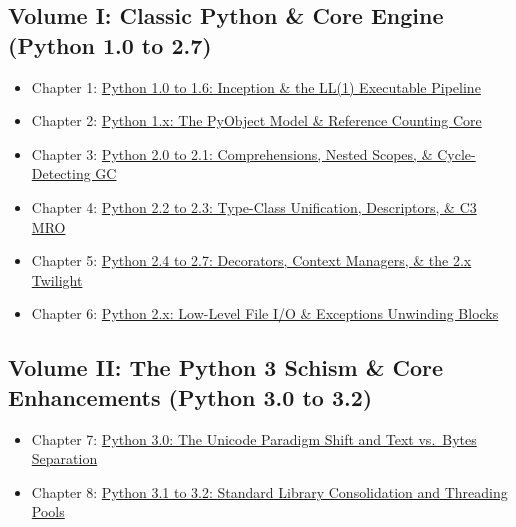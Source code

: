 \hypertarget{volume-i-classic-python-core-engine-python-1.0-to-2.7}{%
\subsection{Volume I: Classic Python \& Core Engine (Python 1.0 to
2.7)}\label{volume-i-classic-python-core-engine-python-1.0-to-2.7}}

\begin{itemize}
\tightlist
\item
  Chapter 1:
  \protect\hyperlink{chapter-1-python-10-to-16-inception--the-ll1-executable-pipeline}{Python
  1.0 to 1.6: Inception \& the LL(1) Executable Pipeline}
\item
  Chapter 2:
  \protect\hyperlink{chapter-2-python-1x-the-pyobject-model--reference-counting-core}{Python
  1.x: The PyObject Model \& Reference Counting Core}
\item
  Chapter 3:
  \protect\hyperlink{chapter-3-python-20-to-21-comprehensions-nested-scopes--cycle-detecting-gc}{Python
  2.0 to 2.1: Comprehensions, Nested Scopes, \& Cycle-Detecting GC}
\item
  Chapter 4:
  \protect\hyperlink{chapter-4-python-22-to-23-type-class-unification-descriptors--c3-mro}{Python
  2.2 to 2.3: Type-Class Unification, Descriptors, \& C3 MRO}
\item
  Chapter 5:
  \protect\hyperlink{chapter-5-python-24-to-27-decorators-context-managers--the-2x-twilight}{Python
  2.4 to 2.7: Decorators, Context Managers, \& the 2.x Twilight}
\item
  Chapter 6:
  \protect\hyperlink{chapter-6-python-2x-low-level-file-io--exceptions-unwinding-blocks}{Python
  2.x: Low-Level File I/O \& Exceptions Unwinding Blocks}
\end{itemize}

\hypertarget{volume-ii-the-python-3-schism-core-enhancements-python-3.0-to-3.2}{%
\subsection{Volume II: The Python 3 Schism \& Core Enhancements (Python
3.0 to
3.2)}\label{volume-ii-the-python-3-schism-core-enhancements-python-3.0-to-3.2}}

\begin{itemize}
\tightlist
\item
  Chapter 7:
  \protect\hyperlink{chapter-7-python-30-the-unicode-paradigm-shift-and-text-vs-bytes-separation}{Python
  3.0: The Unicode Paradigm Shift and Text vs.~Bytes Separation}
\item
  Chapter 8:
  \protect\hyperlink{chapter-8-python-31-to-32-standard-library-consolidation-and-threading-pools}{Python
  3.1 to 3.2: Standard Library Consolidation and Threading Pools}
\end{itemize}

